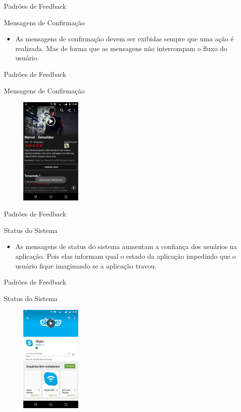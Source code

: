\begin{frame}{Padrões de Feedback}
\begin{block}{Mensagens de Confirmação}
  \begin{itemize}
    \item<1-> As mensagens de confirmação devem ser exibidas sempre que uma ação é realizada. Mas de forma que as mensagens não interrompam o fluxo do usuário.
  \end{itemize}
\end{block}
\end{frame}

\begin{frame}{Padrões de Feedback}
\begin{block}{Mensagens de Confirmação}
    \begin{figure}
    \includegraphics[width=3cm]{figuras/confirm/confirm1}
    \end{figure}
\end{block}
\end{frame}


\begin{frame}{Padrões de Feedback}
\begin{block}{Status do Sistema}
  \begin{itemize}
    \item<1-> As mensagens de status do sistema aumentam a confiança dos usuários na aplicação. Pois elas informam qual o estado da aplicação impedindo que o usuário fique imaginando se a aplicação travou.
  \end{itemize}
\end{block}
\end{frame}

\begin{frame}{Padrões de Feedback}
\begin{block}{Status do Sistema}
    \begin{figure}
    \includegraphics[width=3cm]{figuras/status/status}
    \end{figure}
\end{block}
\end{frame}

